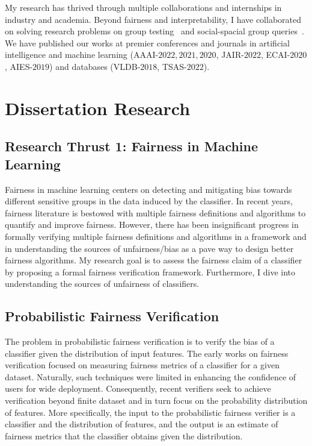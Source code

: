 \documentclass[11pt]{article}
\begin{document}
	
	My research has thrived through multiple collaborations and internships in industry and academia. Beyond fairness and interpretability, I have collaborated on solving research problems on  group testing~\cite{ciampiconi2020maxsat} and social-spacial group queries~\cite{ghosh2018flexible,apon2021social}. We have published our works at premier conferences and journals in artificial intelligence and machine learning (AAAI-$ 2022, 2021, 2020 $, JAIR-$ 2022 $, ECAI-$ 2020 $, AIES-$ 2019 $) and databases (VLDB-$ 2018 $, TSAS-$ 2022 $).
	
	
	
	
	
	\section*{Dissertation Research}
	
	\subsection*{Research Thrust 1: Fairness in Machine Learning}
	
	Fairness in machine learning centers on detecting and mitigating bias towards different sensitive groups in the data induced by the classifier. In recent years, fairness literature is bestowed with multiple fairness definitions and algorithms to quantify and improve fairness. However, there has been insignificant progress in formally verifying multiple fairness definitions and algorithms in a framework and in understanding the sources of unfairness/bias as a pave way to design better fairness algorithms. My research goal is to assess the fairness claim of a classifier by proposing a formal fairness verification framework. Furthermore, I dive into understanding the sources of unfairness of classifiers.
	
	\subsection*{Probabilistic Fairness Verification} The problem in probabilistic fairness verification is to verify the bias of a classifier given the distribution of input features. The early works on fairness verification focused on measuring fairness metrics of a classifier for a given dataset. Naturally, such techniques were limited in enhancing the confidence of users for wide deployment. Consequently, recent verifiers seek to achieve verification beyond  finite dataset and in turn focus on the  probability distribution of features. More specifically, the input to the probabilistic fairness verifier is a classifier and  the distribution of features, and the output is an estimate of fairness metrics that the classifier obtains given the distribution.
	
\end{document}
